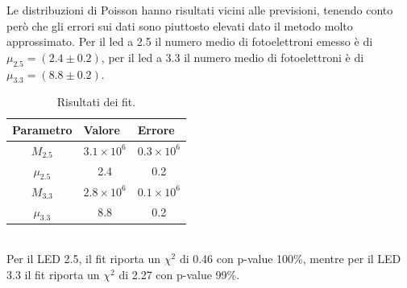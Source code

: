 \documentclass[11pt]{article} %
\begin{document}
Le distribuzioni di Poisson hanno risultati vicini alle previsioni, tenendo conto però che gli errori sui dati sono piuttosto elevati dato il metodo molto approssimato. Per il led a 2.5 il numero medio di fotoelettroni emesso è di $\mu_{2.5}=\left(2.4\pm0.2\right)$, per il led a 3.3 il numero medio di fotoelettroni è di $\mu_{3.3}=\left(8.8\pm0.2\right)$.
\begin{table}[!h]
\begin{center}
\begin{tabular}{|c|c|c|}
\hline
\multicolumn{1}{|l|}{Parametro} & \multicolumn{1}{l|}{Valore} & \multicolumn{1}{l|}{Errore}  \\ \hline\hline
$M_{2.5}$                               & $3.1\times10^{6} $                     & $0.3\times10^{6}  $                          \\ \hline
$\mu_{2.5}$                               & 2.4                       & 0.2                             \\ \hline \hline
$M_{3.3}$                               & $2.8\times10^{6} $                   & $0.1\times10^{6} $                        \\ \hline
$\mu_{3.3}$                               & 8.8                      & 0.2                             \\ \hline
\end{tabular}
\end{center}
\caption{Risultati dei fit.}
\end{table}
\\Per il LED 2.5, il fit riporta un $\chi^2$ di 0.46 con p-value 100\%, mentre per il LED 3.3 il fit riporta un $\chi^2$ di 2.27 con p-value 99\%.
\end{document}
